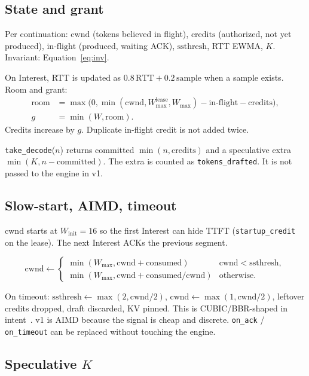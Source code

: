 \documentclass{article}
\theoremstyle{definition}
\newcommand{\cwnd}{\mathrm{cwnd}}
\newcommand{\ssth}{\mathrm{ssthresh}}
\begin{document}
\subsection{State and grant}

Per continuation: $\cwnd$ (tokens believed in flight), $\mathrm{credits}$ (authorized, not yet produced), $\mathrm{in\textrm{-}flight}$ (produced, waiting ACK), $\ssth$, RTT EWMA, $K$.
Invariant: Equation~\ref{eq:inv}.

On Interest, RTT is updated as $0.8\,\mathrm{RTT} + 0.2\,\mathrm{sample}$ when a sample exists.
Room and grant:
\begin{align}
\mathrm{room} &= \max\bigl(0, \min(\cwnd, W_{\max}^{\mathrm{lease}}, W_{\max}) - \mathrm{in\textrm{-}flight} - \mathrm{credits}\bigr), \\
g &= \min(W, \mathrm{room}).
\end{align}
Credits increase by $g$.
Duplicate in-flight credit is not added twice.

\texttt{take\_decode}($n$) returns committed $\min(n, \mathrm{credits})$ and a speculative extra $\min(K, n - \mathrm{committed})$.
The extra is counted as \texttt{tokens\_drafted}.
It is not passed to the engine in v1.

\subsection{Slow-start, AIMD, timeout}

$\cwnd$ starts at $W_{\mathrm{init}}{=}16$ so the first Interest can hide TTFT (\texttt{startup\_credit} on the lease).
The next Interest ACKs the previous segment.

\begin{equation}
\cwnd \leftarrow
\begin{cases}
\min(W_{\max}, \cwnd + \mathrm{consumed}) & \cwnd < \ssth, \\
\min(W_{\max}, \cwnd + \mathrm{consumed}/\cwnd) & \text{otherwise.}
\end{cases}
\end{equation}

On timeout: $\ssth \leftarrow \max(2, \cwnd/2)$, $\cwnd \leftarrow \max(1, \cwnd/2)$, leftover credits dropped, draft discarded, KV pinned.
This is CUBIC/BBR-shaped in intent~\citep{jacobson1988congestion}.
v1 is AIMD because the signal is cheap and discrete.
\texttt{on\_ack} / \texttt{on\_timeout} can be replaced without touching the engine.

\subsection{\texorpdfstring{Speculative $K$}{Speculative K}}
\end{document}
